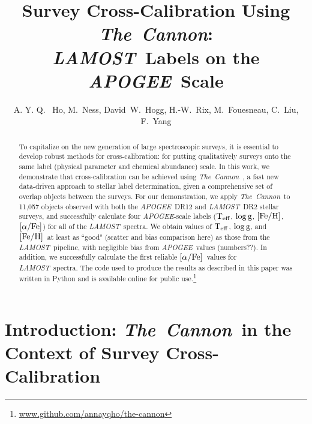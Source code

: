 \documentclass[12pt, preprint]{aastex}
\newcommand{\tc}{\textsl{The~Cannon}}
\newcommand{\apogee}{\textsl{APOGEE}}
\newcommand{\lamost}{\textsl{LAMOST}}
\newcommand{\teff}{\mbox{$\rm T_{eff}$}}
\newcommand{\feh}{\mbox{$\rm [Fe/H]$}}
\newcommand{\alphafe}{\mbox{$\rm [\alpha/Fe]$}}
\newcommand{\logg}{\mbox{$\rm \log g$}}
\begin{document}
\title{Survey Cross-Calibration Using \tc: \\ \lamost\ Labels on the \apogee\ Scale}
\author{A. Y. Q. ~Ho,
M.~Ness,
David~W.~Hogg, 
H.-W.~Rix,
M.~Fouesneau,
C.~Liu,
F.~Yang
}


\begin{abstract}

To capitalize on the new generation of large spectroscopic surveys, 
it is essential to develop robust methods for cross-calibration: for putting 
qualitatively surveys onto the same label (physical parameter and 
chemical abundance) scale. In this work, we demonstrate that
cross-calibration can be achieved using \tc\ \citep{ness2015}, a fast
new data-driven approach to stellar label determination, given a
comprehensive set of overlap objects between the surveys. 
For our demonstration, we apply \tc\ to 11,057 objects observed with 
both the \apogee\ DR12 and \lamost\ DR2 stellar surveys, and successfully
calculate four \apogee-scale labels (\teff, \logg, \feh, \alphafe) for all of
the \lamost\ spectra. We obtain values of
\teff, \logg, and \feh\ at least as ``good" (scatter and bias comparison here)
as those from the \lamost\ 
pipeline, with negligible bias from \apogee\ values (numbers??). In addition, we
successfully calculate the first reliable \alphafe\ values for \lamost\ 
spectra. 
The code used to produce the results as described in this paper was written in
Python and is available online for public 
use.\footnote{\url{www.github.com/annayqho/the-cannon}}

\end{abstract}


\section{Introduction: \tc\ in the Context of Survey Cross-Calibration}
\end{document}
